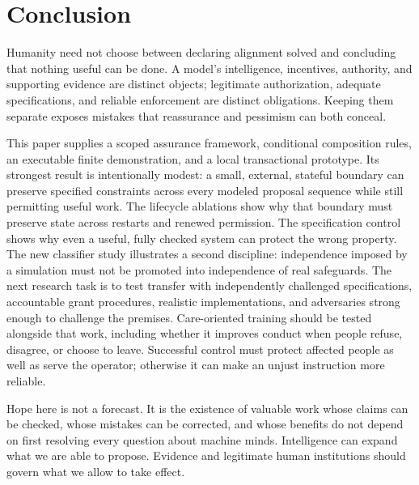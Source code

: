 \section{Conclusion}
Humanity need not choose between declaring alignment solved and concluding that nothing useful can be done. A model's intelligence, incentives, authority, and supporting evidence are distinct objects; legitimate authorization, adequate specifications, and reliable enforcement are distinct obligations. Keeping them separate exposes mistakes that reassurance and pessimism can both conceal.

This paper supplies a scoped assurance framework, conditional composition rules, an executable finite demonstration, and a local transactional prototype. Its strongest result is intentionally modest: a small, external, stateful boundary can preserve specified constraints across every modeled proposal sequence while still permitting useful work. The lifecycle ablations show why that boundary must preserve state across restarts and renewed permission. The specification control shows why even a useful, fully checked system can protect the wrong property. The new classifier study illustrates a second discipline: independence imposed by a simulation must not be promoted into independence of real safeguards. The next research task is to test transfer with independently challenged specifications, accountable grant procedures, realistic implementations, and adversaries strong enough to challenge the premises. Care-oriented training should be tested alongside that work, including whether it improves conduct when people refuse, disagree, or choose to leave. Successful control must protect affected people as well as serve the operator; otherwise it can make an unjust instruction more reliable.

Hope here is not a forecast. It is the existence of valuable work whose claims can be checked, whose mistakes can be corrected, and whose benefits do not depend on first resolving every question about machine minds. Intelligence can expand what we are able to propose. Evidence and legitimate human institutions should govern what we allow to take effect.

